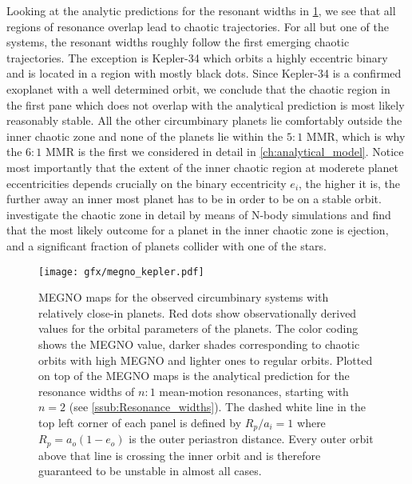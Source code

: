 \documentclass[ twoside,openright,titlepage,numbers=noenddot,headinclude,%
                footinclude=true,cleardoublepage=empty,abstractoff, %
                BCOR=5mm,paper=a4,fontsize=11pt,%
                american,%
                ]{scrreprt}
\begin{document}
Looking at the analytic predictions for the resonant widths in 
\cref{fig:megno_kepler}, we see that all regions of resonance overlap
lead to chaotic trajectories. For all but one of the systems, the 
resonant widths roughly follow the first emerging chaotic trajectories.
The exception is Kepler-34 which orbits a highly eccentric binary
and is located in a region with mostly black dots. Since Kepler-34 
is a confirmed exoplanet with a well determined orbit, we conclude 
that the chaotic region in the first pane which does not overlap with 
the analytical prediction is most likely reasonably stable. All the 
other circumbinary planets lie comfortably outside the inner
chaotic zone and none of the planets lie within the $5:1$ MMR, which
is why the $6:1$ MMR is the first we considered in detail in 
\cref{ch:analytical_model}. Notice most importantly that
the extent of the inner chaotic region at moderete planet eccentricities
depends crucially on the binary eccentricity $e_i$, the higher it is, 
the further away an inner most planet has to be in order to be on a
stable orbit. \cite{Sutherland2015} investigate the chaotic zone
in detail by means of N-body simulations and find that the most likely
outcome for a planet in the inner chaotic zone is ejection, and a 
significant fraction of planets collider with one of the stars.
\begin{figure}[!t]
\centering
\texttt{[image: gfx/megno\_kepler.pdf]}
\caption{MEGNO maps for the observed circumbinary systems with relatively
    close-in planets. Red dots show observationally derived values for 
    the orbital parameters of the planets. The color coding shows the MEGNO 
    value, darker shades 
    corresponding to chaotic orbits with high MEGNO and lighter ones to 
    regular orbits. Plotted on top of the MEGNO maps is the analytical 
    prediction for the resonance widths of $n:1$ mean-motion resonances, 
    starting with $n=2$ (see \cref{ssub:Resonance_widths}). 
The dashed white line in
    the top left corner of each panel  is defined 
    by $R_p/a_i=1$ where $R_p=a_o(1-e_o)$
    is the outer periastron distance. Every outer orbit above that line
    is crossing the inner orbit and is therefore guaranteed to be 
    unstable in almost all cases.}
\label{fig:megno_kepler}
\end{figure}
\end{document}
